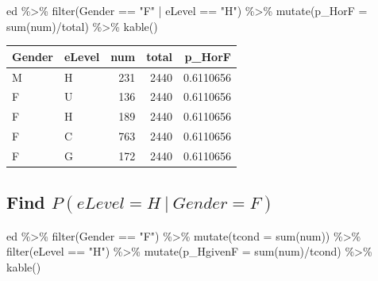 \documentclass[
  letterpaper,
]{book}
\newenvironment{Shaded}{\begin{snugshade}}{\end{snugshade}}
\newcommand{\AttributeTok}[1]{\textcolor[rgb]{0.40,0.45,0.13}{#1}}
\newcommand{\FunctionTok}[1]{\textcolor[rgb]{0.28,0.35,0.67}{#1}}
\newcommand{\NormalTok}[1]{\textcolor[rgb]{0.00,0.23,0.31}{#1}}
\newcommand{\SpecialCharTok}[1]{\textcolor[rgb]{0.37,0.37,0.37}{#1}}
\newcommand{\StringTok}[1]{\textcolor[rgb]{0.13,0.47,0.30}{#1}}
\begin{document}
\begin{Shaded}
\begin{Highlighting}[]
\NormalTok{ed }\SpecialCharTok{\%\textgreater{}\%}
  \FunctionTok{filter}\NormalTok{(Gender }\SpecialCharTok{==} \StringTok{"F"} \SpecialCharTok{|}\NormalTok{ eLevel }\SpecialCharTok{==} \StringTok{"H"}\NormalTok{) }\SpecialCharTok{\%\textgreater{}\%}
  \FunctionTok{mutate}\NormalTok{(}\AttributeTok{p\_HorF =} \FunctionTok{sum}\NormalTok{(num)}\SpecialCharTok{/}\NormalTok{total) }\SpecialCharTok{\%\textgreater{}\%}
  \FunctionTok{kable}\NormalTok{()}
\end{Highlighting}
\end{Shaded}

\begin{longtable}[]{@{}llrrr@{}}
\toprule\noalign{}
Gender & eLevel & num & total & p\_HorF \\
\midrule\noalign{}
\endhead
\bottomrule\noalign{}
\endlastfoot
M & H & 231 & 2440 & 0.6110656 \\
F & U & 136 & 2440 & 0.6110656 \\
F & H & 189 & 2440 & 0.6110656 \\
F & C & 763 & 2440 & 0.6110656 \\
F & G & 172 & 2440 & 0.6110656 \\
\end{longtable}

\hypertarget{find-pelevel-h-gender-f}{%
\subsection{\texorpdfstring{Find
\(P(eLevel = H\ |\ Gender = F)\)}{Find P(eLevel = H\textbackslash{} \textbar\textbackslash{} Gender = F)}}\label{find-pelevel-h-gender-f}}

\begin{Shaded}
\begin{Highlighting}[]
\NormalTok{ed }\SpecialCharTok{\%\textgreater{}\%}
  \FunctionTok{filter}\NormalTok{(Gender }\SpecialCharTok{==} \StringTok{"F"}\NormalTok{) }\SpecialCharTok{\%\textgreater{}\%}
  \FunctionTok{mutate}\NormalTok{(}\AttributeTok{tcond =} \FunctionTok{sum}\NormalTok{(num)) }\SpecialCharTok{\%\textgreater{}\%} 
  \FunctionTok{filter}\NormalTok{(eLevel }\SpecialCharTok{==} \StringTok{"H"}\NormalTok{) }\SpecialCharTok{\%\textgreater{}\%}
  \FunctionTok{mutate}\NormalTok{(}\AttributeTok{p\_HgivenF =} \FunctionTok{sum}\NormalTok{(num)}\SpecialCharTok{/}\NormalTok{tcond) }\SpecialCharTok{\%\textgreater{}\%}
  \FunctionTok{kable}\NormalTok{()}
\end{Highlighting}
\end{Shaded}
\end{document}
